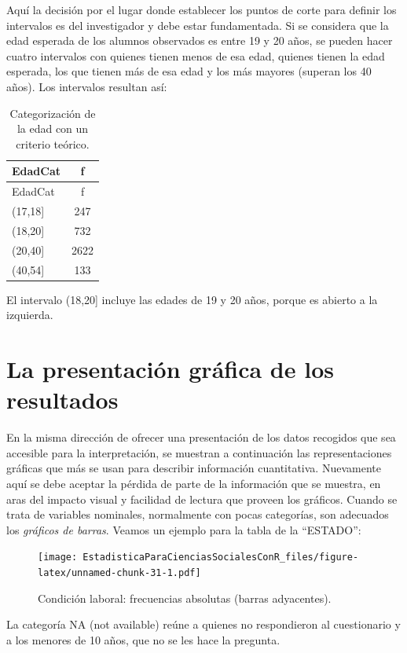 \documentclass[]{book}
\begin{document}
Aquí la decisión por el lugar donde establecer los puntos de corte para definir los intervalos es del investigador y debe estar fundamentada. Si se considera que la edad esperada de los alumnos observados es entre 19 y 20 años, se pueden hacer cuatro intervalos con quienes tienen menos de esa edad, quienes tienen la edad esperada, los que tienen más de esa edad y los más mayores (superan los 40 años). Los intervalos resultan así:

\begin{longtable}[]{@{}lc@{}}
\caption{\label{tab:unnamed-chunk-30}Categorización de la edad con un criterio teórico.}\tabularnewline
\toprule
EdadCat & f\tabularnewline
\midrule
\endfirsthead
\toprule
EdadCat & f\tabularnewline
\midrule
\endhead
(17,18{]} & 247\tabularnewline
(18,20{]} & 732\tabularnewline
(20,40{]} & 2622\tabularnewline
(40,54{]} & 133\tabularnewline
\bottomrule
\end{longtable}

El intervalo (18,20{]} incluye las edades de 19 y 20 años, porque es abierto a la izquierda.

\hypertarget{la-presentacion-grafica-de-los-resultados}{%
\section{La presentación gráfica de los resultados}\label{la-presentacion-grafica-de-los-resultados}}

En la misma dirección de ofrecer una presentación de los datos recogidos que sea accesible para la interpretación, se muestran a continuación las representaciones gráficas que más se usan para describir información cuantitativa. Nuevamente aquí se debe aceptar la pérdida de parte de la información que se muestra, en aras del impacto visual y facilidad de lectura que proveen los gráficos.
Cuando se trata de variables nominales, normalmente con pocas categorías, son adecuados los \emph{gráficos de barras}. Veamos un ejemplo para la tabla de la ``ESTADO'':

\begin{figure}
\centering
\texttt{[image: EstadisticaParaCienciasSocialesConR\_files/figure-latex/unnamed-chunk-31-1.pdf]}
\caption{\label{fig:unnamed-chunk-31}Condición laboral: frecuencias absolutas (barras adyacentes).}
\end{figure}

La categoría NA (not available) reúne a quienes no respondieron al cuestionario y a los menores de 10 años, que no se les hace la pregunta.
\end{document}
